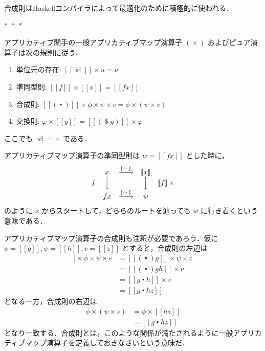\documentclass[a5paper,twoside,fleqn,draft]{jsbook}
\def\[{[\![}
\def\]{]\!]}
\newcommand{\separator}{\begin{center}$*$~$*$~$*$\end{center}}
\newcommand{\programminglanguage}[1]{\textsf{#1}}
\newcommand{\haskell}{\programminglanguage{Haskell}}
\newcommand{\mAnonParam}{\diamond}
\newcommand{\mSpecialFunc}[1]{\mathrm{#1}}
\DeclareMathOperator{\mId}{\mSpecialFunc{id}}
\DeclareMathOperator{\mApply}{\$}
\DeclareMathOperator{\mAppMap}{\times}
\DeclareMathOperator{\mCompFunc}{\centerdot}
\DeclareMathOperator{\mMap}{\cdot}
\newcommand{\mPureWith}[1]{\[#1\]}
\begin{document}
合成則は\haskell コンパイラによって最適化のために積極的に使われる．

\separator

アプリカティブ関手の一般アプリカティブマップ演算子 $(\mAppMap)$ およびピュア演算子は次の規則に従う．
\begin{enumerate}
\item 単位元の存在: $\mPureWith{\mId}\mAppMap u=u$
\item 準同型則: $\mPureWith{f}\mAppMap\mPureWith{x}=\mPureWith{fx}$
\item 合成則: $\mPureWith{(\mCompFunc)}\mAppMap\phi\mAppMap\psi\mAppMap v=\phi\mAppMap{}(\psi\mAppMap v)$
\item 交換則: $\varphi\mAppMap\mPureWith{y}=\mPureWith{(\mApply y)}\mAppMap\varphi$
\end{enumerate}
ここでも $\mId=\mAnonParam$ である．

アプリカティブマップ演算子の準同型則は $w=\mPureWith{fx}$ とした時に，
\begin{equation}
\begin{matrix}
&x&\xrightarrow{\mPureWith{\dotsb}}&\mPureWith{x}\\
f&\Big\downarrow&&\Big\downarrow&\mPureWith{f}\mAppMap\\
&fx&\xrightarrow{\mPureWith{\dotsb}}&w
\end{matrix}
\end{equation}
のように $x$ からスタートして，どちらのルートを辿っても $w$ に行き着くという意味である．

アプリカティブマップ演算子の合成則も注釈が必要であろう．仮に $\phi=\mPureWith{g},\psi=\mPureWith{h},v=\mPureWith{z}$ とすると，合成則の左辺は
\begin{align}
\mPureWith{(\mCompFunc)}\mAppMap\phi\mAppMap\psi\mAppMap v
&=\mPureWith{(\mCompFunc)g}\mAppMap\psi\mAppMap v\\
&=\mPureWith{(\mCompFunc)gh}\mAppMap v\\
&=\mPureWith{g\mCompFunc h}\mAppMap v\\
&=\mPureWith{g\mCompFunc hz}
\end{align}
となる一方，合成則の右辺は
\begin{align}
\phi\mAppMap{}(\psi\mAppMap v)
&=\phi\mAppMap\mPureWith{hz}\\
&=\mPureWith{g\mCompFunc hz}
\end{align}
となり一致する．合成則とは，このような関係が満たされるように一般アプリカティブマップ演算子を定義しておきなさいという意味だ．
\end{document}
